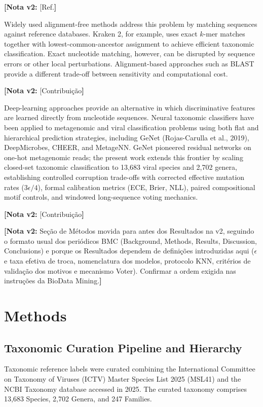 \documentclass[11pt,a4paper]{article}
\newcommand{\notavdois}[1]{\par\vspace{0.4em}\noindent\colorbox{yellow!25}{\begin{minipage}{0.96\linewidth}\footnotesize\textbf{[Nota v2:} #1\textbf{]}\end{minipage}}\par\vspace{0.4em}}
\begin{document}
\notavdois{[Ref.}


Widely used alignment-free methods address this problem by matching sequences against reference databases. Kraken 2, for example, uses exact $k$-mer matches together with lowest-common-ancestor assignment to achieve efficient taxonomic classification. Exact nucleotide matching, however, can be disrupted by sequence errors or other local perturbations. Alignment-based approaches such as BLAST provide a different trade-off between sensitivity and computational cost.

\notavdois{[Contribuição}


Deep-learning approaches provide an alternative in which discriminative features are learned directly from nucleotide sequences. Neural taxonomic classifiers have been applied to metagenomic and viral classification problems using both flat and hierarchical prediction strategies, including GeNet (Rojas-Carulla et al., 2019), DeepMicrobes, CHEER, and MetageNN. GeNet pioneered residual networks on one-hot metagenomic reads; the present work extends this frontier by scaling closed-set taxonomic classification to 13,683 viral species and 2,702 genera, establishing controlled corruption trade-offs with corrected effective mutation rates ($3\epsilon/4$), formal calibration metrics (ECE, Brier, NLL), paired compositional motif controls, and windowed long-sequence voting mechanics.

\notavdois{[Contribuição}


\notavdois{Seção de Métodos movida para antes dos Resultados na v2, seguindo o formato usual dos periódicos BMC (Background, Methods, Results, Discussion, Conclusions) e porque os Resultados dependem de definições introduzidas aqui ($\epsilon$ e taxa efetiva de troca, nomenclatura dos modelos, protocolo KNN, critérios de validação dos motivos e mecanismo Voter). Confirmar a ordem exigida nas instruções da BioData Mining.}


\section{Methods}

\subsection{Taxonomic Curation Pipeline and Hierarchy}
Taxonomic reference labels were curated combining the International Committee on Taxonomy of Viruses (ICTV) Master Species List 2025 (MSL41) and the NCBI Taxonomy database accessed in 2025. The curated taxonomy comprises 13,683 Species, 2,702 Genera, and 247 Families.
\end{document}
